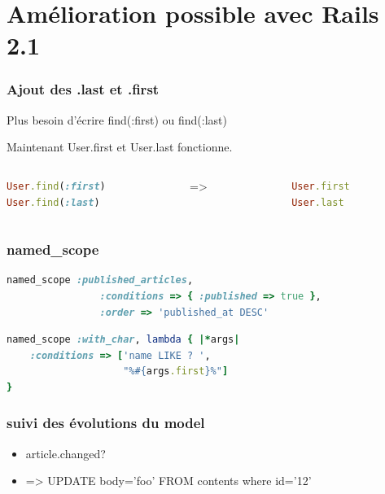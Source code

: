 \documentclass{beamer}
\begin{document}
\section{Amélioration possible avec Rails 2.1}

\begin{frame}[fragile]
    \frametitle{Ajout des .last et .first}
    Plus besoin d'écrire find(:first) ou find(:last) 

    Maintenant User.first et User.last fonctionne.

    \begin{columns}
        \begin{column}[l]{4cm}
            \begin{lstlisting}[language=Ruby]
User.find(:first)
User.find(:last)
            \end{lstlisting}
        \end{column}
        \begin{column}[c]{1cm}
        =>
        \end{column}
        \begin{column}[r]{4cm}
            \begin{lstlisting}[language=Ruby]
User.first
User.last
            \end{lstlisting}
        \end{column}
    \end{columns}
\end{frame}

\begin{frame}[fragile]
    \frametitle{named\_scope}
            \begin{lstlisting}[language=Ruby,showstringspaces=false ]
named_scope :published_articles, 
                :conditions => { :published => true }, 
                :order => 'published_at DESC'
            \end{lstlisting}
            \begin{lstlisting}[language=Ruby,showstringspaces=false]
named_scope :with_char, lambda { |*args| 
    :conditions => ['name LIKE ? ', 
                    "%#{args.first}%"]
}
            \end{lstlisting}
\end{frame}

\begin{frame}
    \frametitle{suivi des évolutions du model}
    \begin{itemize}
        \item article.changed?
        \item => UPDATE body='foo' FROM contents where id='12'
    \end{itemize}
\end{frame}
\end{document}
